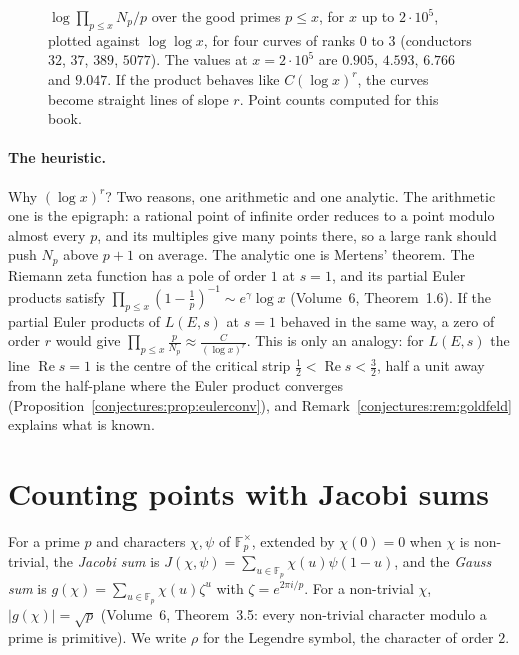 \begin{figure}[ht]
\centering
{}
\caption{$\log\prod_{p\le x}N_p/p$ over the good primes $p\le x$, for $x$ up to $2\cdot10^5$, plotted against $\log\log x$, for four curves of ranks $0$ to $3$
(conductors $32$, $37$, $389$, $5077$). The values at $x=2\cdot10^5$ are $0.905$, $4.593$, $6.766$ and $9.047$. If the product behaves like $C(\log x)^r$,
the curves become straight lines of slope $r$. Point counts computed for this book.}
\label{conjectures:fig:bsd}
\end{figure}

\paragraph{The heuristic.} Why $(\log x)^r$? Two reasons, one arithmetic and one analytic. The arithmetic one is the epigraph: a rational point of infinite
order reduces to a point modulo almost every $p$, and its multiples give many points there, so a large rank should push $N_p$ above $p+1$ on average. The
analytic one is Mertens' theorem. The Riemann zeta function has a pole of order $1$ at $s=1$, and its partial Euler products satisfy
$\prod_{p\le x}(1-\frac1p)^{-1}\sim e^\gamma\log x$ (Volume~6, Theorem~1.6). If the partial Euler products of $L(E,s)$ at $s=1$ behaved in the same way, a zero
of order $r$ would give $\prod_{p\le x}\frac p{N_p}\approx\frac C{(\log x)^r}$. This is only an analogy: for $L(E,s)$ the line $\operatorname{Re}s=1$ is the centre of the critical strip
$\frac12<\operatorname{Re}s<\frac32$, half a unit away from the half-plane where the Euler product converges (Proposition~\ref{conjectures:prop:eulerconv}), and
Remark~\ref{conjectures:rem:goldfeld} explains what is known.

\section{Counting points with Jacobi sums}

For a prime $p$ and characters $\chi,\psi$ of $\mathbb F_p^\times$, extended by $\chi(0)=0$ when $\chi$ is non-trivial, the \emph{Jacobi sum} is
$J(\chi,\psi)=\sum_{u\in\mathbb F_p}\chi(u)\psi(1-u)$, and the \emph{Gauss sum} is $g(\chi)=\sum_{u\in\mathbb F_p}\chi(u)\zeta^u$ with $\zeta=e^{2\pi i/p}$.
For a non-trivial $\chi$, $|g(\chi)|=\sqrt p$ (Volume~6, Theorem~3.5: every non-trivial character modulo a prime is primitive). We write $\rho$ for the
Legendre symbol, the character of order $2$.

